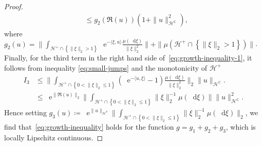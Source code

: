 \documentclass[10pt,a4paper,reqno]{amsart}
\newcommand*\D{\mathop{}\!\mathrm{d}}
\newcommand*\E{\mathop{}\!\mathrm{e}}
\numberwithin{equation}{section}
\theoremstyle{plain}
\theoremstyle{definition}
\theoremstyle{example}
\newcommand{\cH}{\mathcal{H}}
\newcommand{\df}{\coloneqq}
\newcommand{\set}[1]{\left\{ #1\right\}}
\newcommand{\norm}[1]{\|#1\|}
\newcommand{\cHplus}{\cH^{+}}
\begin{document}
\begin{proof}
\begin{align*}
                                                                              &\leq g_{2}(\Re(u))(1+\norm{u}_{\cH^{\mathbb{C}}}^{2}),
  \end{align*}
  where $g_{2}(u)=\norm{\int_{\cHplus\cap\set{\norm{\xi}_2>1}}\E^{-\langle
    \xi, u\rangle}\frac{\mu(\D\xi)}{\norm{\xi}_2^{2}}}+\norm{\mu(\cHplus\cap\set{\norm{\xi}_2>1})}$.
  Finally, for the third term in the right hand side of~\eqref{eq:growth-inequality-1}, it follows from inequality \eqref{eq:small-jumps} and the monotonicity of $\cHplus$
   \begin{align*}
  I_3 &\leq
   \norm{\int_{\cHplus\cap\set{0<\norm{\xi}_2\leq 1}}(\E^{-\langle u,\xi\rangle}-1)\frac{\mu(\D\xi)}{\norm{\xi}_2^{2}}}_{2}\norm{u}_{\cH^{\mathbb{C}}}.\\  
   &\leq\E^{\norm{\Re(u)}_2}\norm{\int_{\cHplus\cap\set{0<\norm{\xi}_2\leq
    1}}\norm{\xi}_2^{-1}\mu(\D\xi)}\norm{u}_{\cH^{\mathbb{C}}}^2.
  \end{align*}
  Hence setting
  $g_{3}(u)\df\E^{\norm{u}_{\cH^{\mathcal{C}}}}\norm{\int_{\cHplus\cap\set{0<\norm{\xi}_2\leq
        1}}\norm{\xi}_2^{-1}\mu(\D\xi)}_2$, we find that~\eqref{eq:growth-inequality} holds for the
  function $g=g_{1}+g_{2}+g_{3}$, which is locally Lipschitz continuous. 
\end{proof}
\end{document}
